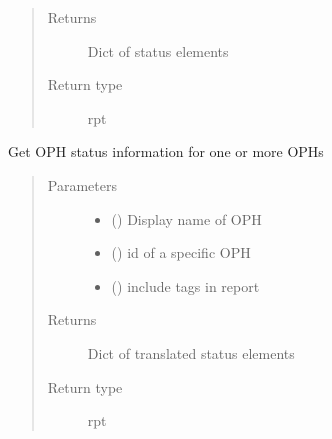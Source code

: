 \documentclass[letterpaper,10pt,english]{sphinxmanual}
\begin{document}
\begin{fulllineitems}
\begin{fulllineitems}
\begin{quote}
\begin{description}
\item[{Returns}] \leavevmode
\sphinxAtStartPar
Dict of status elements

\item[{Return type}] \leavevmode
\sphinxAtStartPar
rpt

\end{description}\end{quote}

\end{fulllineitems}


\begin{fulllineitems}
\label{\detokenize{b1oph-class:bloxone.b1oph.oph_status_summary}}
\sphinxAtStartPar
Get OPH status information for one or more OPHs
\begin{quote}\begin{description}
\item[{Parameters}] \leavevmode\begin{itemize}
\item {} 
\sphinxAtStartPar
{} () \textendash{} Display name of OPH

\item {} 
\sphinxAtStartPar
{} () \textendash{} id of a specific OPH

\item {} 
\sphinxAtStartPar
{} () \textendash{} include tags in report

\end{itemize}

\item[{Returns}] \leavevmode
\sphinxAtStartPar
Dict of translated status elements

\item[{Return type}] \leavevmode
\sphinxAtStartPar
rpt


\end{description}
\end{quote}
\end{fulllineitems}
\end{fulllineitems}
\end{document}
